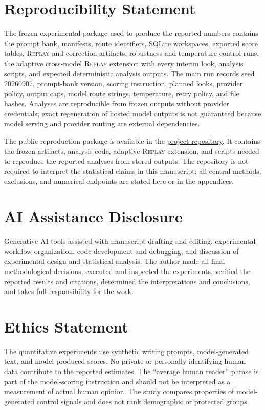 \documentclass[10pt]{article}
\newcommand{\replay}{\textsc{Replay}}
\begin{document}
\section*{Reproducibility Statement}
The frozen experimental package used to produce the reported numbers contains the prompt bank, manifests, route identifiers, SQLite workspaces, exported score tables, \replay{} and correction artifacts, robustness and temperature-control runs, the adaptive cross-model \replay{} extension with every interim look, analysis scripts, and expected deterministic analysis outputs. The main run records seed 20260907, prompt-bank version, scoring instruction, planned looks, provider policy, output caps, model route strings, temperature, retry policy, and file hashes. Analyses are reproducible from frozen outputs without provider credentials; exact regeneration of hosted model outputs is not guaranteed because model serving and provider routing are external dependencies.

The public reproduction package is available in the \href{https://github.com/victorlavrenko/llm-gogol-effect}{project repository}. It contains the frozen artifacts, analysis code, adaptive \replay{} extension, and scripts needed to reproduce the reported analyses from stored outputs. The repository is not required to interpret the statistical claims in this manuscript; all central methods, exclusions, and numerical endpoints are stated here or in the appendices.

\section*{AI Assistance Disclosure}
Generative AI tools assisted with manuscript drafting and editing, experimental workflow organization, code development and debugging, and discussion of experimental design and statistical analysis. The author made all final methodological decisions, executed and inspected the experiments, verified the reported results and citations, determined the interpretations and conclusions, and takes full responsibility for the work.

\section*{Ethics Statement}
The quantitative experiments use synthetic writing prompts, model-generated text, and model-produced scores. No private or personally identifying human data contribute to the reported estimates. The ``average human reader'' phrase is part of the model-scoring instruction and should not be interpreted as a measurement of actual human opinion. The study compares properties of model-generated control signals and does not rank demographic or protected groups.
\end{document}
